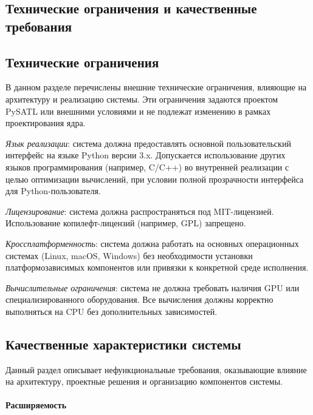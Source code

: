 \subsection{Технические ограничения и качественные требования}

\subsection{Технические ограничения}
В данном разделе перечислены внешние технические ограничения, влияющие на архитектуру и реализацию системы. Эти ограничения задаются проектом PySATL или внешними условиями и не подлежат изменению в рамках проектирования ядра.

\begin{itemizecmp}
    \item \textit{Язык реализации}: система должна предоставлять основной пользовательский интерфейс на языке Python версии 3.x. Допускается использование других языков программирования (например, C/C++) во внутренней реализации с целью оптимизации вычислений, при условии полной прозрачности интерфейса для Python-пользователя.
    \item \textit{Лицензирование}: система должна распространяться под MIT-лицензией. Использование копилефт-лицензий (например, GPL) запрещено.
    \item \textit{Кроссплатформенность}: система должна работать на основных операционных системах (Linux, macOS, Windows) без необходимости установки платформозависимых компонентов или привязки к конкретной среде исполнения.
    \item \textit{Вычислительные ограничения}: система не должна требовать наличия GPU или специализированного оборудования. Все вычисления должны корректно выполняться на CPU без дополнительных зависимостей. 
\end{itemizecmp}

\subsection{Качественные характеристики системы}

Данный раздел описывает нефункциональные требования, оказывающие влияние на архитектуру, проектные решения и организацию компонентов системы.

\paragraph{Расширяемость}

